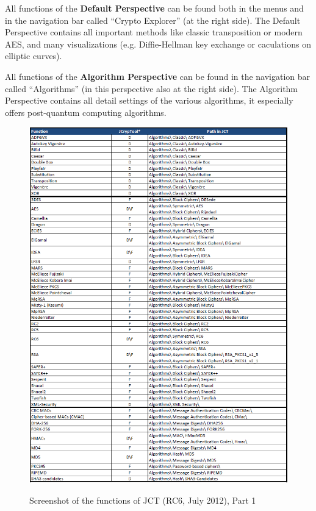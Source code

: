 All functions of the {\bf Default Perspective} can be found both in the menus and in the navigation bar called ``Crypto Explorer'' (at the right side).
The Default Perspective contains all important methods like classic transposition or modern AES, and many visualizations (e.g. Diffie-Hellman key exchange or caculations on elliptic curves).

All functions of the {\bf Algorithm Perspective} can be found in the navigation bar called ``Algorithms'' (in this perspective also at the right side).
The Algorithm Perspective contains all detail settings of the various algorithms, it especially offers post-quantum computing algorithms.

\clearpage
\begin{figure}[hb]
\begin{center}
\vspace{-30pt}
\includegraphics[scale=0.8, angle=0] {figures/JCT-functions-en-1}
\hypertarget{functions-overview-1-JCT}{}
\caption{Screenshot of the functions of JCT (RC6, July 2012), Part 1} 
\label{functions-overview-1-JCT}
\end{center}
\end{figure}
\clearpage

